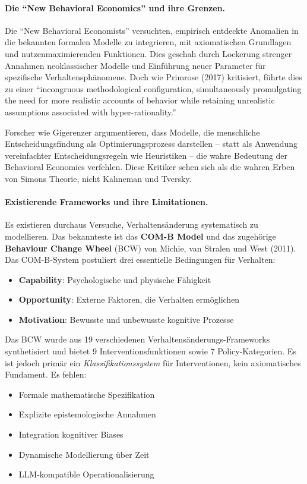 \paragraph{Die ``New Behavioral Economics'' und ihre Grenzen.}
Die ``New Behavioral Economists'' versuchten, empirisch entdeckte Anomalien in die bekannten formalen Modelle zu integrieren, mit axiomatischen Grundlagen und nutzenmaximierenden Funktionen. Dies geschah durch Lockerung strenger Annahmen neoklassischer Modelle und Einführung neuer Parameter für spezifische Verhaltensphänomene. Doch wie Primrose (2017) kritisiert, führte dies zu einer ``incongruous methodological configuration, simultaneously promulgating the need for more realistic accounts of behavior while retaining unrealistic assumptions associated with hyper-rationality.''

Forscher wie Gigerenzer argumentieren, dass Modelle, die menschliche Entscheidungsfindung als Optimierungsprozess darstellen -- statt als Anwendung vereinfachter Entscheidungsregeln wie Heuristiken -- die wahre Bedeutung der Behavioral Economics verfehlen. Diese Kritiker sehen sich als die wahren Erben von Simons Theorie, nicht Kahneman und Tversky.

\paragraph{Existierende Frameworks und ihre Limitationen.}
Es existieren durchaus Versuche, Verhaltensänderung systematisch zu modellieren. Das bekannteste ist das \textbf{COM-B Model} und das zugehörige \textbf{Behaviour Change Wheel} (BCW) von Michie, van Stralen und West (2011). Das COM-B-System postuliert drei essentielle Bedingungen für Verhalten:

\begin{itemize}
    \item \textbf{Capability}: Psychologische und physische Fähigkeit
    \item \textbf{Opportunity}: Externe Faktoren, die Verhalten ermöglichen
    \item \textbf{Motivation}: Bewusste und unbewusste kognitive Prozesse
\end{itemize}

Das BCW wurde aus 19 verschiedenen Verhaltensänderungs-Frameworks synthetisiert und bietet 9 Interventionsfunktionen sowie 7 Policy-Kategorien. Es ist jedoch primär ein \textit{Klassifikationssystem} für Interventionen, kein axiomatisches Fundament. Es fehlen:

\begin{itemize}
    \item Formale mathematische Spezifikation
    \item Explizite epistemologische Annahmen
    \item Integration kognitiver Biases
    \item Dynamische Modellierung über Zeit
    \item LLM-kompatible Operationalisierung
\end{itemize}


